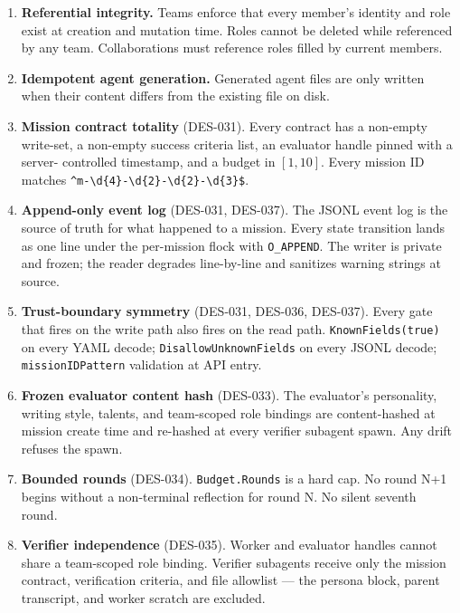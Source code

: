 \documentclass[a4paper,10pt]{article}
\newcommand{\field}[1]{\texttt{#1}}
\begin{document}
\begin{enumerate}
  \item \textbf{Referential integrity.}  Teams enforce that every
    member's identity and role exist at creation and mutation time.
    Roles cannot be deleted while referenced by any team.
    Collaborations must reference roles filled by current members.

  \item \textbf{Idempotent agent generation.}  Generated agent files
    are only written when their content differs from the existing
    file on disk.

  \item \textbf{Mission contract totality} (DES-031).  Every
    contract has a non-empty write-set, a non-empty success
    criteria list, an evaluator handle pinned with a server-
    controlled timestamp, and a budget in $[1, 10]$.  Every
    mission ID matches \verb|^m-\d{4}-\d{2}-\d{2}-\d{3}$|.

  \item \textbf{Append-only event log} (DES-031, DES-037).  The
    JSONL event log is the source of truth for what happened to a
    mission.  Every state transition lands as one line under the
    per-mission flock with \texttt{O\_APPEND}.  The writer is
    private and frozen; the reader degrades line-by-line and
    sanitizes warning strings at source.

  \item \textbf{Trust-boundary symmetry} (DES-031, DES-036, DES-037).
    Every gate that fires on the write path also fires on the read
    path.  \texttt{KnownFields(true)} on every YAML decode;
    \texttt{DisallowUnknownFields} on every JSONL decode;
    \texttt{missionIDPattern} validation at API entry.

  \item \textbf{Frozen evaluator content hash} (DES-033).  The
    evaluator's personality, writing style, talents, and team-scoped
    role bindings are content-hashed at mission create time and
    re-hashed at every verifier subagent spawn.  Any drift refuses
    the spawn.

  \item \textbf{Bounded rounds} (DES-034).  \field{Budget.Rounds}
    is a hard cap.  No round N+1 begins without a non-terminal
    reflection for round N.  No silent seventh round.

  \item \textbf{Verifier independence} (DES-035).  Worker and
    evaluator handles cannot share a team-scoped role binding.
    Verifier subagents receive only the mission contract,
    verification criteria, and file allowlist --- the persona block,
    parent transcript, and worker scratch are excluded.


\end{enumerate}
\end{document}
